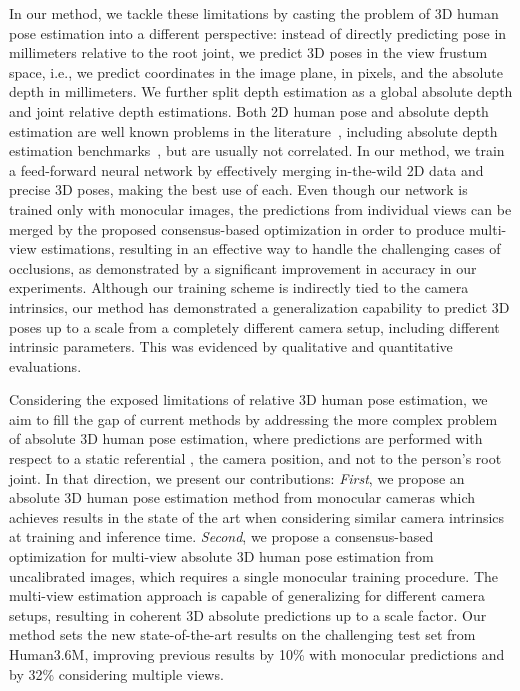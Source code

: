 \documentclass[10pt,twocolumn,letterpaper]{article}
\newcommand{\revb}[1]{{#1}}
\begin{document}
In our method, we tackle these
limitations by casting the problem of 3D human pose estimation into a different
perspective: instead of directly predicting pose in millimeters relative to the root joint, we predict
\revb{3D poses in the view frustum space, i.e., we predict}
 coordinates in the image plane, in pixels, and the absolute depth in
millimeters. \revb{We further split depth estimation as a global absolute depth and joint relative depth estimations}.
Both 2D human pose and absolute depth estimation are well known problems
in the literature~\cite{Andriluka_2014_CVPR, NIPS2014_5539, NIPS2016_6489, laina2016deeper},
including absolute depth estimation benchmarks~\cite{Silberman:ECCV12, diode_dataset},
but are usually not correlated.
\revb{In our method, we train a feed-forward neural network by effectively merging in-the-wild 2D data and precise 3D poses, making the best use of each. Even though our network is trained only with monocular images, the predictions from individual views can be merged by the proposed consensus-based optimization in order to produce multi-view estimations, resulting in an effective way to handle the challenging cases of occlusions, as demonstrated by a significant improvement in accuracy in our experiments. Although our training scheme is indirectly tied to the camera intrinsics, our method has demonstrated a generalization capability to predict 3D poses up to a scale from a completely different camera setup, including different intrinsic parameters. This was evidenced by qualitative and quantitative evaluations.}



Considering the exposed limitations of relative 3D human pose estimation,
we aim to fill the gap of current methods by addressing the more complex
problem of absolute 3D human pose estimation, where predictions are performed
with respect to a static referential \ie, the camera position, and not to the
person's root joint.
In that direction, we present our contributions:
\textit{First}, we propose an absolute 3D human pose estimation method from
monocular cameras \revb{which achieves results in the state of the art when considering similar camera intrinsics at training and inference time}.
\textit{Second}, we propose a consensus-based optimization for multi-view
absolute 3D human pose estimation from uncalibrated images, which requires a single monocular training procedure. \revb{The multi-view estimation approach is capable of generalizing for different camera setups, resulting in coherent 3D absolute predictions up to a scale factor}.
Our method sets the new state-of-the-art results on
the challenging test set from Human3.6M, \revb{improving previous results by 10\%
with monocular predictions and by 32\% considering multiple views.}
\end{document}
